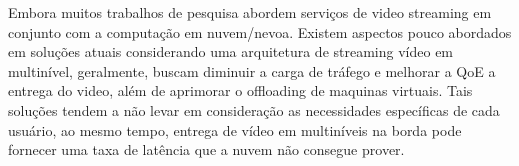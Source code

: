 
Embora muitos trabalhos de pesquisa abordem serviços de video streaming em conjunto com a computação em nuvem/nevoa. Existem aspectos pouco abordados em soluções atuais considerando uma arquitetura de streaming vídeo em multinível, geralmente, buscam diminuir a carga de tráfego e melhorar a QoE a entrega do video, além de aprimorar o offloading de maquinas virtuais.
Tais soluções tendem a não levar em consideração as necessidades específicas de cada usuário, ao mesmo tempo, entrega de vídeo em multiníveis na borda pode fornecer uma taxa de latência que a nuvem não consegue prover.



